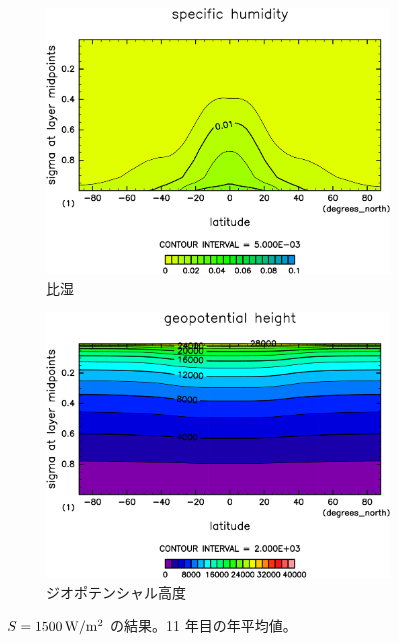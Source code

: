 \documentclass[body]{subfiles}
\begin{document}
\begin{figure}[t]
\begin{subfigure}{.4\textwidth}
		\includegraphics[width=\columnwidth]{S1500/QH2OVap,time=3650:4015-crop-rotate.pdf}
		\caption{比湿}\label{S1500比湿}
	\end{subfigure}
	\begin{subfigure}{.4\textwidth}
		\centering
		\includegraphics[width=\columnwidth]{S1500/Height,time=3650:4015-crop-rotate.pdf}
		\caption{ジオポテンシャル高度}\label{S1500ジオポテンシャル高度}
	\end{subfigure}
	\caption{
		\(S=1500\hmu{W/m^2}\) の結果。11 年目の年平均値。
	}\label{S1500}
\end{figure}
\end{document}
